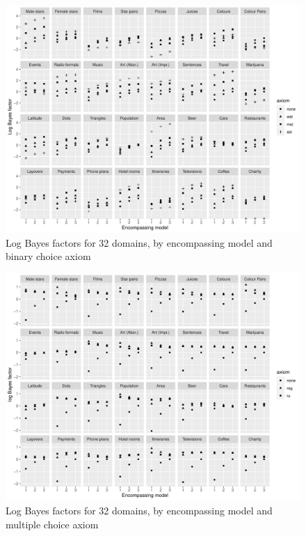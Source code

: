 \documentclass[11pt,letter]{article}
\begin{document}
\begin{figure}
	\begin{center}
	\includegraphics[width=16cm]{Figures/binary_BF}
	\caption{Log Bayes factors for 32 domains, by encompassing model and binary choice axiom}\label{f:binary_BF}
	\end{center}
\end{figure}

\begin{figure}
	\begin{center}
	\includegraphics[width=16cm]{Figures/multiple_BF}
	\caption{Log Bayes factors for 32 domains, by encompassing model and multiple choice axiom}\label{f:multiple_BF}
	\end{center}
\end{figure}
\end{document}
